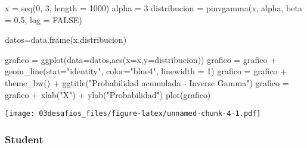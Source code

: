 \documentclass[
]{article}
\newenvironment{Shaded}{\begin{snugshade}}{\end{snugshade}}
\newcommand{\AttributeTok}[1]{\textcolor[rgb]{0.77,0.63,0.00}{#1}}
\newcommand{\ConstantTok}[1]{\textcolor[rgb]{0.00,0.00,0.00}{#1}}
\newcommand{\DecValTok}[1]{\textcolor[rgb]{0.00,0.00,0.81}{#1}}
\newcommand{\FloatTok}[1]{\textcolor[rgb]{0.00,0.00,0.81}{#1}}
\newcommand{\FunctionTok}[1]{\textcolor[rgb]{0.00,0.00,0.00}{#1}}
\newcommand{\NormalTok}[1]{#1}
\newcommand{\OtherTok}[1]{\textcolor[rgb]{0.56,0.35,0.01}{#1}}
\newcommand{\SpecialCharTok}[1]{\textcolor[rgb]{0.00,0.00,0.00}{#1}}
\newcommand{\StringTok}[1]{\textcolor[rgb]{0.31,0.60,0.02}{#1}}
\begin{document}
\begin{Shaded}
\begin{Highlighting}[]
\NormalTok{x }\OtherTok{=} \FunctionTok{seq}\NormalTok{(}\DecValTok{0}\NormalTok{, }\DecValTok{3}\NormalTok{, }\AttributeTok{length =} \DecValTok{1000}\NormalTok{)}
\NormalTok{alpha }\OtherTok{=} \DecValTok{3}
\NormalTok{distribucion }\OtherTok{=} \FunctionTok{pinvgamma}\NormalTok{(x, alpha, }\AttributeTok{beta =} \FloatTok{0.5}\NormalTok{, }\AttributeTok{log =} \ConstantTok{FALSE}\NormalTok{)}

\NormalTok{datos}\OtherTok{=}\FunctionTok{data.frame}\NormalTok{(x,distribucion)}

\NormalTok{grafico }\OtherTok{=} \FunctionTok{ggplot}\NormalTok{(}\AttributeTok{data=}\NormalTok{datos,}\FunctionTok{aes}\NormalTok{(}\AttributeTok{x=}\NormalTok{x,}\AttributeTok{y=}\NormalTok{distribucion))}
\NormalTok{grafico }\OtherTok{=}\NormalTok{ grafico }\SpecialCharTok{+} \FunctionTok{geom\_line}\NormalTok{(}\AttributeTok{stat=}\StringTok{"identity"}\NormalTok{, }\AttributeTok{color=}\StringTok{"blue4"}\NormalTok{, }\AttributeTok{linewidth =} \DecValTok{1}\NormalTok{)}
\NormalTok{grafico }\OtherTok{=}\NormalTok{ grafico }\SpecialCharTok{+} \FunctionTok{theme\_bw}\NormalTok{() }\SpecialCharTok{+} \FunctionTok{ggtitle}\NormalTok{(}\StringTok{"Probabilidad acumulada {-} Inverse Gamma"}\NormalTok{)}
\NormalTok{grafico }\OtherTok{=}\NormalTok{ grafico }\SpecialCharTok{+} \FunctionTok{xlab}\NormalTok{(}\StringTok{"X"}\NormalTok{) }\SpecialCharTok{+} \FunctionTok{ylab}\NormalTok{(}\StringTok{"Probabilidad"}\NormalTok{)}
\FunctionTok{plot}\NormalTok{(grafico)}
\end{Highlighting}
\end{Shaded}

\texttt{[image: 03desafios\_files/figure-latex/unnamed-chunk-4-1.pdf]}

\hypertarget{student-1}{%
\subsubsection{Student}\label{student-1}}
\end{document}
